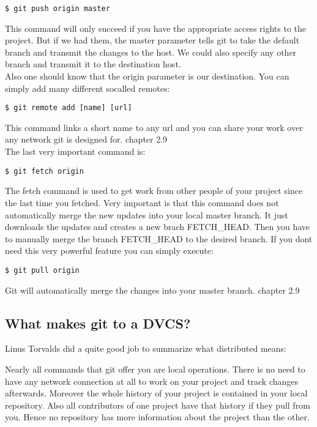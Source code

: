 \begin{lstlisting}
$ git push origin master 
\end{lstlisting}

This command will only succeed if you have the appropriate access rights to the
project. But if we had them, the master parameter tells git to take the default
branch and transmit the changes to the host. We could also specify any other
branch and transmit it to the destination host. \\ 

Also one should know that the origin parameter is our destination. You can
simply add many different socalled remotes:

\begin{lstlisting}
$ git remote add [name] [url]
\end{lstlisting}

This command links a short name to any url and you can share your
work over any network git is designed for. \cite{gitpro2009} chapter 2.9 \\

The last very important command is:
\begin{lstlisting}
$ git fetch origin
\end{lstlisting}

The fetch command is used to get work from other people of your project since
the last time you fetched. Very important is that this command does not
automatically merge the new updates into your local master branch. It just
downloads the updates and creates a new brach FETCH\_HEAD. Then you have to
manually merge the branch FETCH\_HEAD to the desired branch. 
If you dont need this very powerful feature you can simply execute:
\begin{lstlisting}
$ git pull origin
\end{lstlisting}
Git will automatically merge the changes into your master branch.
\cite{gitpro2009} chapter 2.9 \\

\subsection {What makes git to a DVCS?}

Linus Torvalds did a quite good job to summarize what distributed means:

 \cite{linustorvaldsgoogletalk2007}

Nearly all commands that git offer you are local operations. There is no need to
have any network connection at all to work on your project and track changes
afterwards. Moreover the whole history of your project is contained in your
local repository. Also all contributors of one project have that history if
they pull from you. Hence no repository has more information about the project
than the other.
